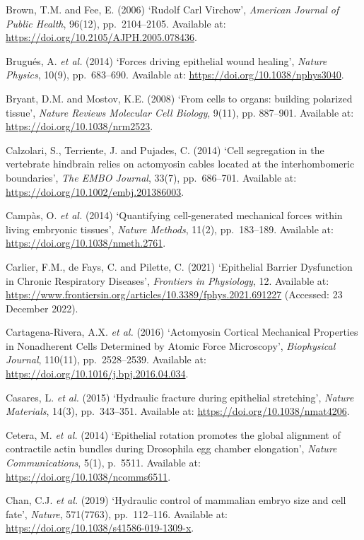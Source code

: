 \documentclass[
]{article}
\begin{document}
Brown, T.M. and Fee, E. (2006) `Rudolf Carl Virchow', \emph{American
Journal of Public Health}, 96(12), pp.~2104--2105. Available at:
\url{https://doi.org/10.2105/AJPH.2005.078436}.

Brugués, A. \emph{et al.} (2014) `Forces driving epithelial wound
healing', \emph{Nature Physics}, 10(9), pp.~683--690. Available at:
\url{https://doi.org/10.1038/nphys3040}.

Bryant, D.M. and Mostov, K.E. (2008) `From cells to organs: building
polarized tissue', \emph{Nature Reviews Molecular Cell Biology}, 9(11),
pp. 887--901. Available at: \url{https://doi.org/10.1038/nrm2523}.

Calzolari, S., Terriente, J. and Pujades, C. (2014) `Cell segregation in
the vertebrate hindbrain relies on actomyosin cables located at the
interhombomeric boundaries', \emph{The EMBO Journal}, 33(7),
pp.~686--701. Available at:
\url{https://doi.org/10.1002/embj.201386003}.

Campàs, O. \emph{et al.} (2014) `Quantifying cell-generated mechanical
forces within living embryonic tissues', \emph{Nature Methods}, 11(2),
pp.~183--189. Available at: \url{https://doi.org/10.1038/nmeth.2761}.

Carlier, F.M., de Fays, C. and Pilette, C. (2021) `Epithelial Barrier
Dysfunction in Chronic Respiratory Diseases', \emph{Frontiers in
Physiology}, 12. Available at:
\url{https://www.frontiersin.org/articles/10.3389/fphys.2021.691227}
(Accessed: 23 December 2022).

Cartagena-Rivera, A.X. \emph{et al.} (2016) `Actomyosin Cortical
Mechanical Properties in Nonadherent Cells Determined by Atomic Force
Microscopy', \emph{Biophysical Journal}, 110(11), pp.~2528--2539.
Available at: \url{https://doi.org/10.1016/j.bpj.2016.04.034}.

Casares, L. \emph{et al.} (2015) `Hydraulic fracture during epithelial
stretching', \emph{Nature Materials}, 14(3), pp.~343--351. Available at:
\url{https://doi.org/10.1038/nmat4206}.

Cetera, M. \emph{et al.} (2014) `Epithelial rotation promotes the global
alignment of contractile actin bundles during Drosophila egg chamber
elongation', \emph{Nature Communications}, 5(1), p.~5511. Available at:
\url{https://doi.org/10.1038/ncomms6511}.

Chan, C.J. \emph{et al.} (2019) `Hydraulic control of mammalian embryo
size and cell fate', \emph{Nature}, 571(7763), pp.~112--116. Available
at: \url{https://doi.org/10.1038/s41586-019-1309-x}.
\end{document}
